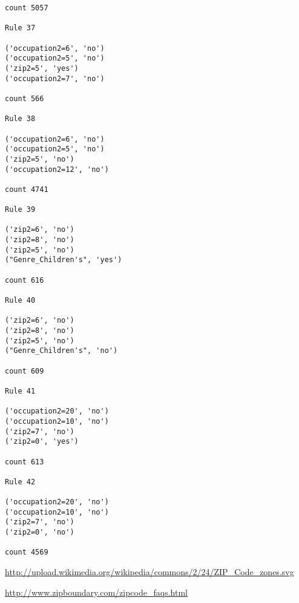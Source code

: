 \documentclass[12pt,fleqn]{article}\usepackage{../common}
\begin{document}
\begin{verbatim}
count 5057

Rule 37

('occupation2=6', 'no')
('occupation2=5', 'no')
('zip2=5', 'yes')
('occupation2=7', 'no')

count 566

Rule 38

('occupation2=6', 'no')
('occupation2=5', 'no')
('zip2=5', 'no')
('occupation2=12', 'no')

count 4741

Rule 39

('zip2=6', 'no')
('zip2=8', 'no')
('zip2=5', 'no')
("Genre_Children's", 'yes')

count 616

Rule 40

('zip2=6', 'no')
('zip2=8', 'no')
('zip2=5', 'no')
("Genre_Children's", 'no')

count 609

Rule 41

('occupation2=20', 'no')
('occupation2=10', 'no')
('zip2=7', 'no')
('zip2=0', 'yes')

count 613

Rule 42

('occupation2=20', 'no')
('occupation2=10', 'no')
('zip2=7', 'no')
('zip2=0', 'no')

count 4569

\end{verbatim}





\url{http://upload.wikimedia.org/wikipedia/commons/2/24/ZIP_Code_zones.svg}

\url{http://www.zipboundary.com/zipcode_faqs.html}
\end{document}
